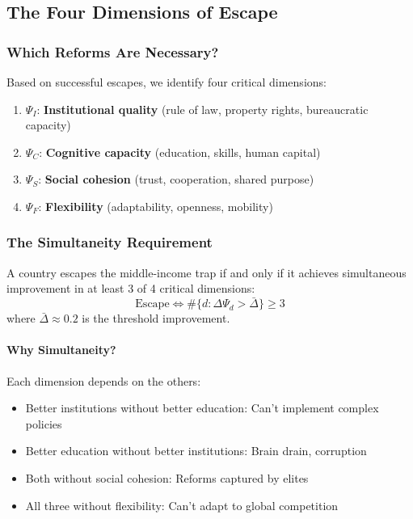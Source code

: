 \subsection{The Four Dimensions of Escape}

\subsubsection{Which Reforms Are Necessary?}

Based on successful escapes, we identify four critical dimensions:

\begin{enumerate}
    \item $\Psi_I$: \textbf{Institutional quality} (rule of law, property rights, bureaucratic capacity)
    \item $\Psi_C$: \textbf{Cognitive capacity} (education, skills, human capital)
    \item $\Psi_S$: \textbf{Social cohesion} (trust, cooperation, shared purpose)
    \item $\Psi_F$: \textbf{Flexibility} (adaptability, openness, mobility)
\end{enumerate}

\subsubsection{The Simultaneity Requirement}

\begin{theorem}
A country escapes the middle-income trap if and only if it achieves 
simultaneous improvement in at least 3 of 4 critical dimensions:
\begin{equation}
\text{Escape} \Leftrightarrow \#\{d : \Delta \Psi_d > \bar{\Delta}\} \geq 3
\label{eq:simultaneity}
\end{equation}
where $\bar{\Delta} \approx 0.2$ is the threshold improvement.
\end{theorem}

\paragraph{Why Simultaneity?}
Each dimension depends on the others:
\begin{itemize}
    \item Better institutions without better education: Can't implement complex policies
    \item Better education without better institutions: Brain drain, corruption
    \item Both without social cohesion: Reforms captured by elites
    \item All three without flexibility: Can't adapt to global competition
\end{itemize}


